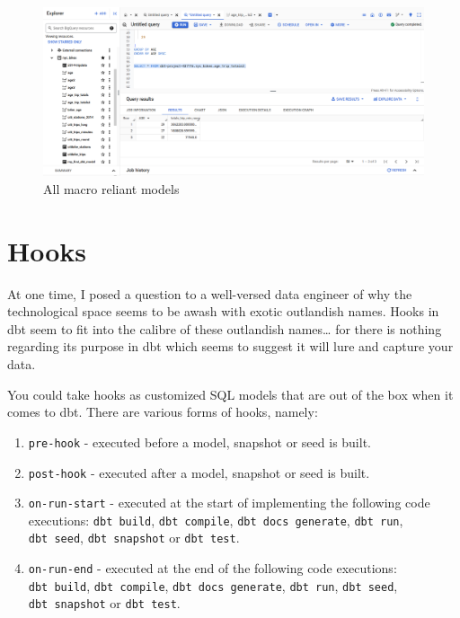 \documentclass[
]{book}
\begin{document}
\begin{figure}
\centering
\includegraphics{./images/macro_reliant.png}
\caption{All macro reliant models}
\end{figure}

\hypertarget{hooks}{%
\chapter{Hooks}\label{hooks}}

At one time, I posed a question to a well-versed data engineer of why the technological space seems to be awash with exotic outlandish names. Hooks in dbt seem to fit into the calibre of these outlandish names\ldots{} for there is nothing regarding its purpose in dbt which seems to suggest it will lure and capture your data.

You could take hooks as customized SQL models that are out of the box when it comes to dbt. There are various forms of hooks, namely:

\begin{enumerate}
\def\labelenumi{\arabic{enumi}.}
\item
  \texttt{pre-hook} - executed before a model, snapshot or seed is built.
\item
  \texttt{post-hook} - executed after a model, snapshot or seed is built.
\item
  \texttt{on-run-start} - executed at the start of implementing the following code executions: \texttt{dbt\ build}, \texttt{dbt\ compile}, \texttt{dbt\ docs\ generate}, \texttt{dbt\ run}, \texttt{dbt\ seed}, \texttt{dbt\ snapshot} or \texttt{dbt\ test}.
\item
  \texttt{on-run-end} - executed at the end of the following code executions: \texttt{dbt\ build}, \texttt{dbt\ compile}, \texttt{dbt\ docs\ generate}, \texttt{dbt\ run}, \texttt{dbt\ seed}, \texttt{dbt\ snapshot} or \texttt{dbt\ test}.
\end{enumerate}
\end{document}
